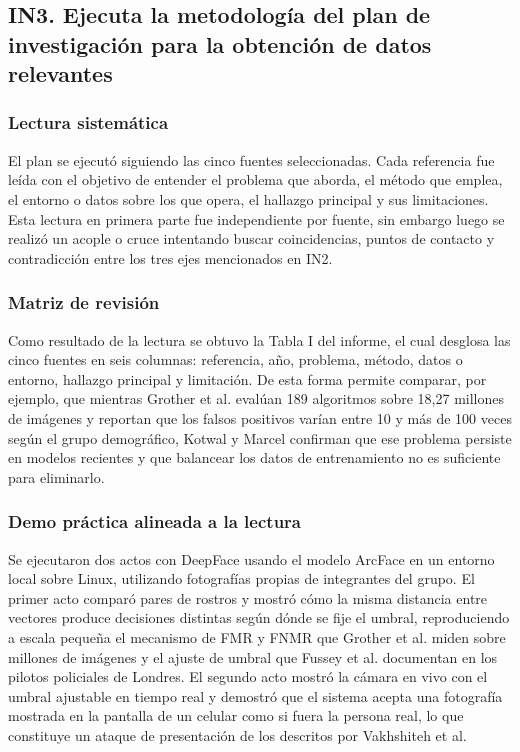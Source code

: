 
\subsection{IN3. Ejecuta la metodología del plan de investigación para la obtención de datos relevantes}

\subsubsection{Lectura sistemática}

El plan se ejecutó siguiendo las cinco fuentes seleccionadas. Cada referencia fue leída con el objetivo de entender el problema que aborda, el método que emplea, el entorno o datos sobre los que opera, el hallazgo principal y sus limitaciones. Esta lectura en primera parte fue independiente por fuente, sin embargo luego se realizó un acople o cruce intentando buscar coincidencias, puntos de contacto y contradicción entre los tres ejes mencionados en IN2.

\subsubsection{Matriz de revisión}

Como resultado de la lectura se obtuvo la Tabla I del informe, el cual desglosa las cinco fuentes en seis columnas: referencia, año, problema, método, datos o entorno, hallazgo principal y limitación. De esta forma permite comparar, por ejemplo, que mientras Grother et al. evalúan 189 algoritmos sobre 18,27 millones de imágenes y reportan que los falsos positivos varían entre 10 y más de 100 veces según el grupo demográfico, Kotwal y Marcel confirman que ese problema persiste en modelos recientes y que balancear los datos de entrenamiento no es suficiente para eliminarlo.

\subsubsection{Demo práctica alineada a la lectura}

Se ejecutaron dos actos con DeepFace usando el modelo ArcFace en un entorno local sobre Linux, utilizando fotografías propias de integrantes del grupo. El primer acto comparó pares de rostros y mostró cómo la misma distancia entre vectores produce decisiones distintas según dónde se fije el umbral, reproduciendo a escala pequeña el mecanismo de FMR y FNMR que Grother et al. miden sobre millones de imágenes y el ajuste de umbral que Fussey et al. documentan en los pilotos policiales de Londres. El segundo acto mostró la cámara en vivo con el umbral ajustable en tiempo real y demostró que el sistema acepta una fotografía mostrada en la pantalla de un celular como si fuera la persona real, lo que constituye un ataque de presentación de los descritos por Vakhshiteh et al.

